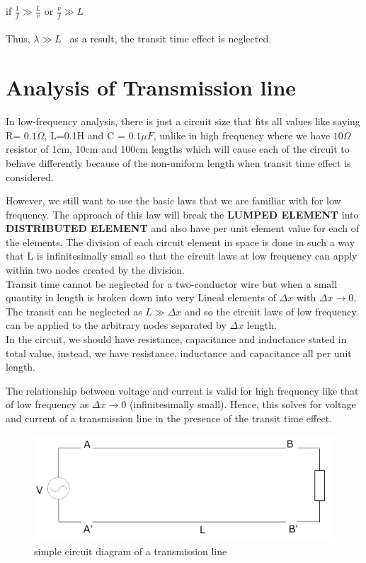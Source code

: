 if \hspace{0.05in}  $ \frac{1}{f} \gg \frac{L}{v} $ or $ \frac{v}{f} \gg L $ \\\\
Thus, $ \lambda \gg L $ \ as a result, the transit time effect is neglected.

\section{Analysis of Transmission line}
In low-frequency analysis, there is just a circuit size that fits all values like saying R= $ 0.1\Omega $, L=0.1H and C = $ 0.1\mu F $, unlike in high frequency where we have $ 10\Omega $ resistor of 1cm, 10cm and 100cm lengths which will cause each of the circuit to behave differently because of the non-uniform length when transit time effect is considered.

However, we still want to use the basic laws that we are familiar with for low frequency. The approach of this law will break the\textbf{ LUMPED ELEMENT} into \textbf{DISTRIBUTED ELEMENT} and also have per unit element value for each of the elements. The division of each circuit element in space is done in such a way that L is infinitesimally small so that the circuit laws at low frequency can apply within two nodes created by the division.\\

Transit time cannot be neglected for a two-conductor wire but when a small quantity in length is broken down into very Lineal elements of $ \Delta x $ with  $  \Delta x \rightarrow 0 $, The transit can be neglected as $ L \gg \Delta x $ and so the circuit laws of low frequency can be applied to the arbitrary nodes separated by $ \Delta x $ length. \\
In the circuit, we should have resistance, capacitance and inductance stated in total value, instead, we have resistance, inductance and capacitance all per unit length.

The relationship between voltage and current is valid for high frequency like that of low frequency as $ \Delta x  \rightarrow 0$ (infinitesimally small). Hence, this solves for voltage and current of a transmission line in the presence of the transit time effect.\\
\begin{figure}[h]
\centering
\includegraphics[width=1\linewidth]{./graphics/second}
\caption{simple circuit diagram of a transmission line}
\end{figure}	


